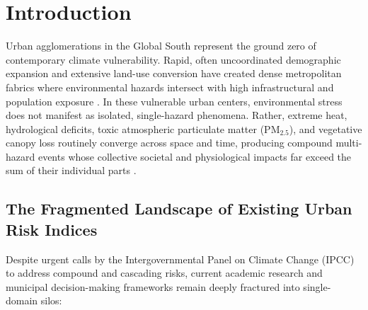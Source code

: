 \section{Introduction}
\label{sec:introduction}

Urban agglomerations in the Global South represent the ground zero of contemporary climate vulnerability. Rapid, often uncoordinated demographic expansion and extensive land-use conversion have created dense metropolitan fabrics where environmental hazards intersect with high infrastructural and population exposure \citep{ipcc2022ar6}. In these vulnerable urban centers, environmental stress does not manifest as isolated, single-hazard phenomena. Rather, extreme heat, hydrological deficits, toxic atmospheric particulate matter ($\text{PM}_{2.5}$), and vegetative canopy loss routinely converge across space and time, producing compound multi-hazard events whose collective societal and physiological impacts far exceed the sum of their individual parts \citep{zscheischler2018future}.

\subsection{The Fragmented Landscape of Existing Urban Risk Indices}
Despite urgent calls by the Intergovernmental Panel on Climate Change (IPCC) to address compound and cascading risks, current academic research and municipal decision-making frameworks remain deeply fractured into single-domain silos:


